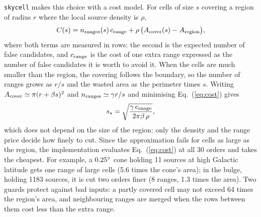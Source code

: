\texttt{skycell} makes this choice with a cost model. For cells of size $s$ covering a
region of radius $r$ where the local source density is $\rho$,
\begin{equation}
  C(s) = n_{\rm ranges}(s)\,c_{\rm range} + \rho\,\bigl(A_{\rm cover}(s) - A_{\rm region}\bigr),
  \label{eq:cost}
\end{equation}
where both terms are measured in rows: the second is the expected number of false
candidates, and $c_{\rm range}$ is the cost of one extra range expressed as the number
of false candidates it is worth to avoid it. When the cells are much smaller than the
region, the covering follows the boundary, so the number of ranges grows as $r/s$ and the
wasted area as the perimeter times $s$. Writing $A_{\rm cover}\simeq\pi(r+\beta s)^2$ and
$n_{\rm ranges}\simeq\gamma r/s$ and minimising Eq.~(\ref{eq:cost}) gives
\begin{equation}
  s_\star = \sqrt{\frac{\gamma\,c_{\rm range}}{2\pi\beta\,\rho}},
  \label{eq:sstar}
\end{equation}
which does not depend on the size of the region: only the density and the range price
decide how finely to cut. Since the approximation fails for cells as large as the region, the
implementation evaluates Eq.~(\ref{eq:cost}) at all 30 orders and takes the cheapest. For example, a $0.25^{\circ}$ cone holding 11 sources at high
Galactic latitude gets one range of large cells (5.6 times the cone's area); in the
bulge, holding 1183 sources, it is cut two orders finer (8 ranges, 1.3 times the area).
Two guards protect against bad inputs: a partly covered cell may not exceed 64 times the
region's area, and neighbouring ranges are merged when the rows between them cost less
than the extra range.


